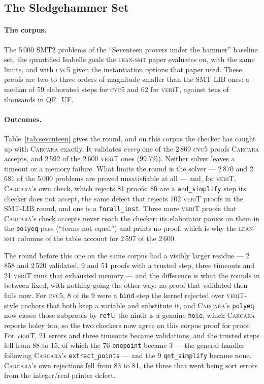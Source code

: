 \documentclass[runningheads]{llncs}
\newcommand{\cvcv}{\textsc{cvc5}\xspace}
\newcommand{\tactic}{\textsc{lean-smt}\xspace}
\newcommand{\carcara}{\textsc{Carcara}\xspace}
\newcommand{\verit}{\textsc{veriT}\xspace}
\newcommand{\rulename}[1]{\texttt{#1}}
\begin{document}
\subsection{The Sledgehammer Set}
\label{sec:seventeen}

\paragraph{The corpus.} The 5\,000 SMT2 problems of the ``Seventeen provers
under the hammer'' baseline set, the quantified Isabelle goals the \tactic
paper evaluates on, with the same limits, and with \cvcv given the
instantiation options that paper used. These proofs are two to three orders
of magnitude smaller than the SMT-LIB ones: a median of 59 elaborated steps
for \cvcv and 62 for \verit, against tens of thousands in QF\_UF.

\paragraph{Outcomes.} Table~\ref{tab:seventeen} gives the round, and on this
corpus the checker has caught up with \carcara exactly. It validates
\emph{every} one of the 2\,869 \cvcv proofs \carcara accepts, and 2\,592 of
the 2\,600 \verit ones (99.7\%). Neither solver leaves a timeout or a memory
failure. What limits the round is the solver --- 2\,870 and 2\,681 of the
5\,000 problems are proved unsatisfiable at all --- and, for \verit,
\carcara's own check, which rejects 81 proofs: 80 are a
\rulename{and\_simplify} step its checker does not accept, the same defect
that rejects 102 \verit proofs in the SMT-LIB round, and one is a
\rulename{forall\_inst}. Three more \verit proofs that \carcara's check
accepts never reach the checker: its elaborator panics on them in the
\texttt{polyeq} pass (``terms not equal'') and prints no proof, which is why
the \tactic columns of the table account for 2\,597 of the 2\,600.

The round before this one on the same corpus had a visibly larger residue ---
2\,858 and 2\,520 validated, 9 and 51 proofs with a trusted step, three
timeouts and 21 \verit runs that exhausted memory --- and the difference is
what the rounds in between fixed, with nothing going the other way: no proof
that validated then fails now. For \cvcv, 8 of its 9 were a \rulename{bind}
step the kernel rejected over \verit-style anchors that both keep a variable
and substitute it, and \carcara's \texttt{polyeq} now closes those subproofs
by \rulename{refl}; the ninth is a genuine \rulename{hole}, which \carcara
reports holey too, so the two checkers now agree on this corpus proof for
proof. For \verit, 21 errors and three timeouts became validations, and the
trusted steps fell from 88 to 15, of which the 76 \rulename{onepoint} became
3 --- the general handler following \carcara's \texttt{extract\_points} --- and
the 9 \rulename{qnt\_simplify} became none. \carcara's own rejections fell
from 83 to 81, the three that went being sort errors from the integer/real
printer defect.
\end{document}
